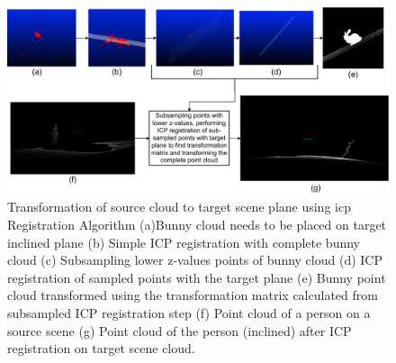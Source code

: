 \begin{figure}[htbp]
    \centering
    \includegraphics[width=1\linewidth]{97_graphics/concepts/icp_registration_analysis.pdf}
    \caption[Transformation of source cloud to target scene plane using \acrshort{icp} Registration Algorithm]{Transformation of source cloud to target scene plane using \acrshort{icp} Registration Algorithm (a)Bunny cloud needs to be placed on target inclined plane (b) Simple ICP registration with complete bunny cloud (c) Subsampling lower z-values points of bunny cloud (d) ICP registration of sampled points with the target plane (e) Bunny point cloud transformed using the transformation matrix calculated from subsampled ICP registration step (f) Point cloud of a person on a source scene (g) Point cloud of the person (inclined) after ICP registration on target scene cloud. } 
    \label{fig:icp_registration_analaysis}
\end{figure}

